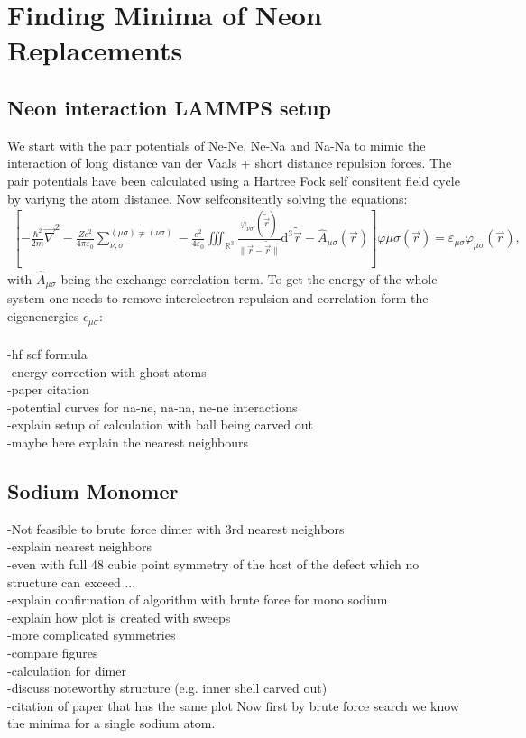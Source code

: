 
\chapter{Finding Minima of Neon Replacements}
\label{chap:Erstes Kapitel}
\section{Neon interaction LAMMPS setup}
We start with the pair potentials of Ne-Ne, Ne-Na and Na-Na to mimic the interaction of long distance van der Vaals + short distance repulsion forces. The pair potentials have been calculated using a Hartree Fock self consitent field cycle by variyng the atom distance. Now selfconsitently solving the equations:\\
\begin{align}
	\left[-\frac{\hbar^2}{2m}\vec{\nabla}^2-\frac{Ze^2}{4\pi\varepsilon_0}\sum_{\nu,\sigma}^{(\mu\sigma)\neq(\nu\sigma)}-\frac{e^2}{4\varepsilon_0}\iiint_{\mathbb{R}^3}\frac{\varphi_{\nu\sigma'}(\tilde{\vec{r}})}{\|\vec{r}-\tilde{\vec{r}}\|}\mathrm{d}^3\tilde{\vec{r}}-\hat{A}_{\mu\sigma}(\vec{r})\right]\varphi{\mu\sigma(\vec{r})}=\varepsilon_{\mu\sigma}\varphi_{\mu\sigma}(\vec{r}),
\end{align}
with $\hat{A}_{\mu\sigma}$ being the exchange correlation term. 
To get the energy of the whole system one needs to remove interelectron repulsion and correlation form the eigenenergies $\epsilon_{\mu\sigma}$:
\begin{align}
	
\end{align}

-hf scf formula\\
-energy correction with ghost atoms\\
-paper citation\\

-potential curves for na-ne, na-na, ne-ne interactions\\
-explain setup of calculation with ball being carved out\\
-maybe here explain the nearest neighbours
\section{Sodium Monomer}
-Not feasible to brute force dimer with 3rd nearest neighbors\\
-explain nearest neighbors\\
-even with full 48 cubic point symmetry of the host of the defect which no structure can exceed ...\\ 
-explain confirmation of algorithm with brute force for mono sodium\\
-explain how plot is created with sweeps\\
-more complicated symmetries\\
-compare figures\\
-calculation for dimer\\
-discuss noteworthy structure (e.g. inner shell carved out)\\
-citation of paper that has the same plot
Now first by brute force search we know the minima for a single sodium atom.

